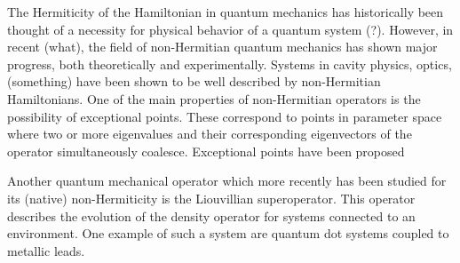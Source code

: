 \documentclass[../main.tex]{subfiles}
\begin{document}
The Hermiticity of the Hamiltonian in quantum mechanics has historically been thought of a necessity for physical behavior of a quantum system (?). However, in recent (what), the field of non-Hermitian quantum mechanics has shown major progress, both theoretically and experimentally. Systems in cavity physics, optics, (something) have been shown to be well described by non-Hermitian Hamiltonians. One of the main properties of non-Hermitian operators is the possibility of exceptional points. These correspond to points in parameter space where two or more eigenvalues and their corresponding eigenvectors of the operator simultaneously coalesce. Exceptional points have been proposed 

Another quantum mechanical operator which more recently has been studied for its (native) non-Hermiticity is the Liouvillian superoperator. This operator describes the evolution of the density operator for systems connected to an environment. One example of such a system are quantum dot systems coupled to metallic leads.





\end{document}
